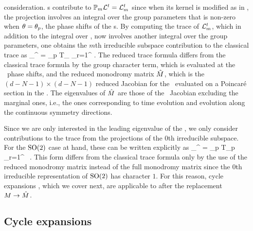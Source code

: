 \documentclass[aip,cha,
reprint,
secnumarabic,
nofootinbib, tightenlines,
nobibnotes, showkeys, showpacs,
superscriptaddress,
]{revtex4-1}
\begin{document}
{consideration. \Rpo s contribute to $\mathbb{P}_m {\cal L}^t = {\cal L}_m^t$ since 
when its kernel is modified as in , the projection involves 
an integral over the group parameters that is non-zero when 
$\theta=\theta_{p}$, the phase shifts of the \rpo s. By computing the 
trace of ${\cal L}_m^t$, which in addition to the integral over \statesp , now 
involves another integral over the group parameters, one obtains the $m$th 
irreducible subspace contribution to the classical trace as
\beq
\sum_{}^{\infty}  = \sum_p T_{\rpprime}
\sum_{r=1}^{\infty}  .
The reduced trace formula  differs from the 
classical trace formula  by the group character
term, which is evaluated at the \rpo\ phase shifts, and the reduced monodromy
matrix $\hat{{M}}$, which is the $(d-N-1)\times(d-N-1)$ reduced Jacobian
for the \rpo\ evaluated on a Poincar\'e section in the \reducedsp . The 
eigenvalues of $\hat{{M}}$ are those of the \rpo\ Jacobian 
 excluding the marginal ones, i.e., the ones 
corresponding to time evolution and evolution along the continuous symmetry 
directions.

Since we are only interested in the leading eigenvalue of the \evOper , we
only consider contributions to the trace  from 
the projections  of the $0$th irreducible 
subspace. For the $\textrm{SO}(2)$ case at hand, these can be written explicitly as
\beq
\sum_{}^{\infty}  = \sum_p T_p
\sum_{r=1}^{\infty}  \, .
This form differs from the classical trace formula
 only by the use of the reduced monodromy 
matrix instead of the full monodromy matrix since the $0$th irreducible 
representation of $\textrm{SO}(2)$ has character $1$. For this reason, cycle 
expansions , which we cover next, are applicable to 
 after the replacement 
${M} \rightarrow \hat{{M}}$.

\subsection{Cycle expansions}
\label{s-CycExp}

}
\end{document}
